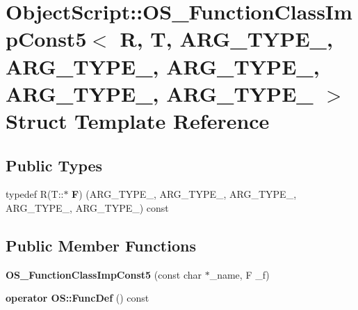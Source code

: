 \hypertarget{struct_object_script_1_1_o_s___function_class_imp_const5}{}\section{Object\+Script\+:\+:O\+S\+\_\+\+Function\+Class\+Imp\+Const5$<$ R, T, A\+R\+G\+\_\+\+T\+Y\+P\+E\+\_, A\+R\+G\+\_\+\+T\+Y\+P\+E\+\_, A\+R\+G\+\_\+\+T\+Y\+P\+E\+\_, A\+R\+G\+\_\+\+T\+Y\+P\+E\+\_, A\+R\+G\+\_\+\+T\+Y\+P\+E\+\_ $>$ Struct Template Reference}
\label{struct_object_script_1_1_o_s___function_class_imp_const5}
\subsection*{Public Types}
\begin{DoxyCompactItemize}
\item 
typedef R(T\+::$\ast$ {\bfseries F}) (A\+R\+G\+\_\+\+T\+Y\+P\+E\+\_, A\+R\+G\+\_\+\+T\+Y\+P\+E\+\_, A\+R\+G\+\_\+\+T\+Y\+P\+E\+\_, A\+R\+G\+\_\+\+T\+Y\+P\+E\+\_, A\+R\+G\+\_\+\+T\+Y\+P\+E\+\_) const \hypertarget{struct_object_script_1_1_o_s___function_class_imp_const5_a0eb85cd971bc02b57e8ad41a6a98d618}{}\label{struct_object_script_1_1_o_s___function_class_imp_const5_a0eb85cd971bc02b57e8ad41a6a98d618}

\end{DoxyCompactItemize}
\subsection*{Public Member Functions}
\begin{DoxyCompactItemize}
\item 
{\bfseries O\+S\+\_\+\+Function\+Class\+Imp\+Const5} (const char $\ast$\+\_\+name, F \+\_\+f)\hypertarget{struct_object_script_1_1_o_s___function_class_imp_const5_ac673d50e86a60b5f3ac696d8092b39dd}{}\label{struct_object_script_1_1_o_s___function_class_imp_const5_ac673d50e86a60b5f3ac696d8092b39dd}

\item 
{\bfseries operator O\+S\+::\+Func\+Def} () const \hypertarget{struct_object_script_1_1_o_s___function_class_imp_const5_a4266d5cee7eba6ebe6019f7705ecf16c}{}\label{struct_object_script_1_1_o_s___function_class_imp_const5_a4266d5cee7eba6ebe6019f7705ecf16c}

\end{DoxyCompactItemize}
